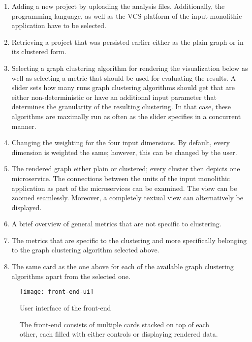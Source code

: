 \documentclass[12pt,a4paper]{report}
\begin{document}
\begin{enumerate}
  \item Adding a new project by uploading the analysis files. Additionally,
        the programming language, as well as the VCS platform of the input
        monolithic application have to be selected.
  \item Retrieving a project that was persisted earlier either as the plain
        graph or in its clustered form.
  \item Selecting a graph clustering algorithm for rendering the visualization
        below as well as selecting a metric that should be used for evaluating
        the results. A slider sets how many runs graph clustering
        algorithms should get that are either non-deterministic or have an
        additional input parameter that determines the granularity of the
        resulting clustering. In that case, these algorithms are maximally run
        as often as the slider specifies in a concurrent manner.
  \item Changing the weighting for the four input dimensions. By default,
        every dimension is weighted the same; however, this can be changed by
        the user.
  \item The rendered graph either plain or clustered; every cluster then depicts
        one microservice. The connections between the units of the
        input monolithic application as part of the microservices can be
        examined. The view can be zoomed seamlessly.
        Moreover, a completely textual view can alternatively be displayed.
  \item A brief overview of general metrics that are not specific to clustering.
  \item The metrics that are specific to the clustering and more specifically
        belonging to the graph clustering algorithm selected above.
  \item The same card as the one above for each of the available
        graph clustering algorithms apart from the selected one.
\end{enumerate}

\begin{figure}[htbp]
\centering
\texttt{[image: front-end-ui]}
\caption{User interface of the front-end}
\caption*{\centering
  The front-end consists of multiple cards stacked on top of each other,
  each filled with either controls or displaying rendered data.
}
\label{fig:front-end-ui}
\end{figure}
\end{document}
